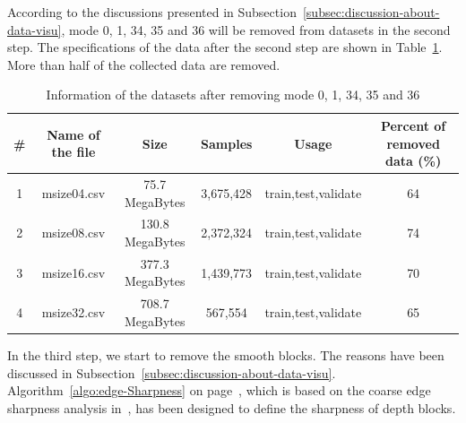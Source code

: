 According to the discussions presented in 
Subsection~\ref{subsec:discussion-about-data-visu},
mode 0, 1, 34, 35 and 36 will be removed from 
datasets in the second step.
The specifications of the data after the second step
are shown in Table~\ref{tab:datasets-after-second-step}.
More than half of the collected data are removed.
\begin{table}[H]
    \caption{Information of the datasets after removing mode 0, 1, 34, 35 and 36}
    \bigskip\label{tab:datasets-after-second-step}
    \centering
    \begin{tabular}{c c c c c c}
        \toprule
        \# & Name of the file & Size & Samples & Usage & Percent of removed data (\%) \\
        \midrule
        1 & msize04.csv & 75.7 MegaBytes & 3,675,428 & train,test,validate & 64 \\
        2 & msize08.csv & 130.8 MegaBytes & 2,372,324 & train,test,validate & 74 \\
        3 & msize16.csv & 377.3 MegaBytes & 1,439,773 & train,test,validate & 70 \\
        4 & msize32.csv & 708.7 MegaBytes & 567,554 & train,test,validate & 65 \\
        \bottomrule
    \end{tabular}
\end{table}
In the third step, we start to remove the smooth blocks.
The reasons have been discussed in 
Subsection~\ref{subsec:discussion-about-data-visu}.
Algorithm~\ref{algo:edge-Sharpness} on page~\pageref{algo:edge-Sharpness},
which is based on the coarse edge sharpness analysis
in~\parencite{RN78}, has been designed to define the
sharpness of depth blocks.

